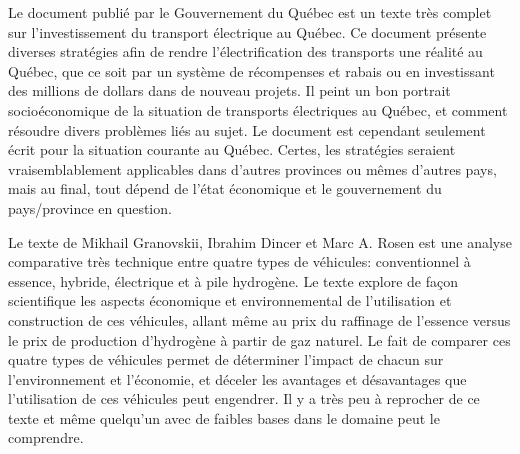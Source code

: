 Le document  publié par le Gouvernement du Québec est un texte très complet sur l'investissement du transport électrique au Québec. Ce document présente diverses stratégies afin de rendre l'électrification des transports une réalité au Québec, que ce soit par un système de récompenses et rabais ou en investissant des millions de dollars dans de nouveau projets. Il peint un bon portrait socioéconomique de la situation de transports électriques au Québec, et comment résoudre divers problèmes liés au sujet. Le document est cependant seulement écrit pour la situation courante au Québec. Certes, les stratégies seraient vraisemblablement applicables dans d'autres provinces ou mêmes d'autres pays, mais au final, tout dépend de l'état économique et le gouvernement du pays/province en question.

Le texte  de Mikhail Granovskii, Ibrahim Dincer et Marc A. Rosen est une analyse comparative très technique entre quatre types de véhicules: conventionnel à essence, hybride, électrique et à pile hydrogène. Le texte explore de façon scientifique les aspects économique et environnemental de l'utilisation et construction de ces véhicules, allant même au prix du raffinage de l'essence versus le prix de production d'hydrogène à partir de gaz naturel. Le fait de comparer ces quatre types de véhicules permet de déterminer l'impact de chacun sur l'environnement et l'économie, et déceler les avantages et désavantages que l'utilisation de ces véhicules peut engendrer. Il y a très peu à reprocher de ce texte et même quelqu'un avec de faibles bases dans le domaine peut le comprendre.

